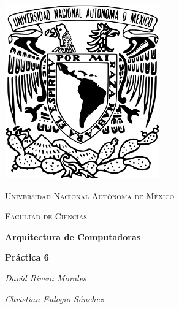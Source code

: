 \begin{titlepage}
    \centering
    \includegraphics[width=0.50\textwidth]{unam_logo.png}\par
    \vspace{1cm}
    {\scshape\Large Universidad Nacional Autónoma de México \par}
    \vspace{1cm}
    {\scshape\Large Facultad de Ciencias \par}
    \vspace{1.5cm}
    {\huge\bfseries Arquitectura de Computadoras \par}
    {\huge\bfseries Práctica 6 \par}
    \vspace{2cm}
    {\Large\itshape David Rivera Morales\par}
    {\Large \itshape Christian Eulogio Sánchez \par}
    \vfill
  
\end{titlepage}

